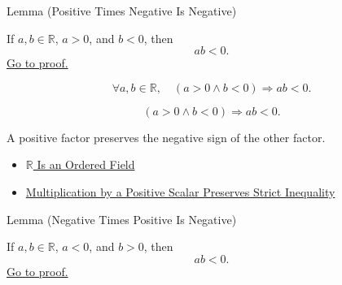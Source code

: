 \begin{lemmabox}{Lemma (Positive Times Negative Is Negative)}
\begin{lemma}\label{lem:positive-times-negative-is-negative}
If $a,b\in\mathbb{R}$, $a>0$, and $b<0$, then
\[
ab<0.
\]
\hyperref[prf:positive-times-negative-is-negative]{Go to proof.}
\end{lemma}
\end{lemmabox}

\begin{remark*}
\[
\forall a,b\in\mathbb{R},\quad (a>0\land b<0)\Rightarrow ab<0.
\]
\end{remark*}

\begin{remark*}
\[
(a>0\land b<0)\Rightarrow ab<0.
\]
\end{remark*}

\begin{remark*}[Interpretation]
A positive factor preserves the negative sign of the other factor.
\end{remark*}

\begin{dependencies}
\begin{itemize}
  \item \hyperref[thm:r-is-an-ordered-field]{$\mathbb{R}$ Is an Ordered Field}
  \item \hyperref[thm:ineq-multiply-positive]{Multiplication by a Positive Scalar Preserves Strict Inequality}
\end{itemize}
\end{dependencies}

\begin{lemmabox}{Lemma (Negative Times Positive Is Negative)}
\begin{lemma}\label{lem:negative-times-positive-is-negative}
If $a,b\in\mathbb{R}$, $a<0$, and $b>0$, then
\[
ab<0.
\]
\hyperref[prf:negative-times-positive-is-negative]{Go to proof.}
\end{lemma}
\end{lemmabox}

